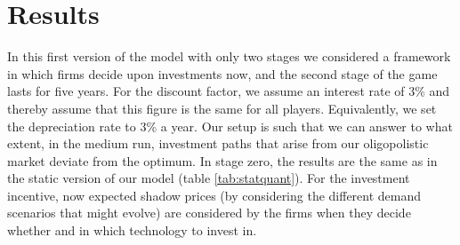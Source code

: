 \section{Results} 

In this first version of the model with only two stages we considered a framework in which firms decide upon investments now, and the second stage of the game lasts for five years. For the discount factor, we assume an interest rate of 3\% and thereby assume that this figure is the same for all players. Equivalently, we set the depreciation rate to 3\% a year. Our setup is such that we can answer to what extent, in the medium run, investment paths that arise from our oligopolistic market deviate from the optimum. In stage zero, the results are the same as in the static version of our model (table \ref{tab:statquant}). For the investment incentive, now expected shadow prices (by considering the different demand scenarios that might evolve) are considered by the firms when they decide whether and in which technology to invest in.

